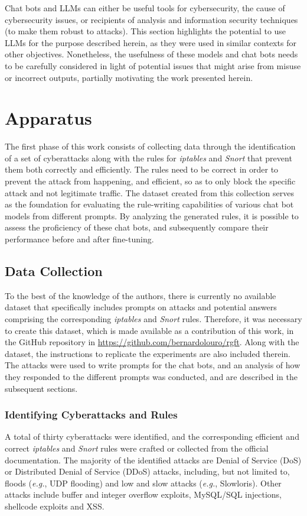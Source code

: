 \documentclass[sigconf]{acmart}
\begin{document}
Chat bots and LLMs can either be useful tools for cybersecurity, the cause of cybersecurity issues, or recipients of analysis and information security techniques (to make them robust to attacks). This section highlights the potential to use LLMs for the purpose described herein, as they were used in similar contexts for other objectives. Nonetheless, the usefulness of these models and chat bots needs to be carefully considered in light of potential issues that might arise from misuse or incorrect outputs, partially motivating the work presented herein.

\section{Apparatus}
The first phase of this work consists of collecting data through the identification of a set of cyberattacks along with the rules for \textit{iptables} and \textit{Snort} that prevent them both correctly and efficiently. The rules need to be correct in order to prevent the attack from happening, and efficient, so as to only block the specific attack and not legitimate traffic. The dataset created from this collection serves as the foundation for evaluating the rule-writing capabilities of various chat bot models from different prompts. By analyzing the generated rules, it is possible to assess the proficiency of these chat bots, and subsequently compare their performance before and after fine-tuning.

\subsection{Data Collection}
To the best of the knowledge of the authors, there is currently no available dataset that specifically includes prompts on attacks and potential answers comprising the corresponding \textit{iptables} and \textit{Snort} rules. Therefore, it was necessary to create this dataset, which is made available as a contribution of this work, in the GitHub repository in \url{https://github.com/bernardolouro/rgft}. Along with the dataset, the instructions to replicate the experiments are also included therein. The attacks were used to write prompts for the chat bots, and an analysis of how they responded to the different prompts was conducted, and are described in the subsequent sections.

\subsubsection{Identifying Cyberattacks and Rules}
A total of thirty cyberattacks were identified, and the corresponding efficient and correct \textit{iptables} and \textit{Snort} rules were crafted or collected from the official documentation. The majority of the identified attacks are Denial of Service (DoS) or Distributed Denial of Service (DDoS) attacks, including, but not limited to, floods (\textit{e.g.}, UDP flooding) and low and slow attacks (\textit{e.g.}, Slowloris). Other attacks include buffer and integer overflow exploits, MySQL/SQL injections, shellcode exploits and XSS.
\end{document}
